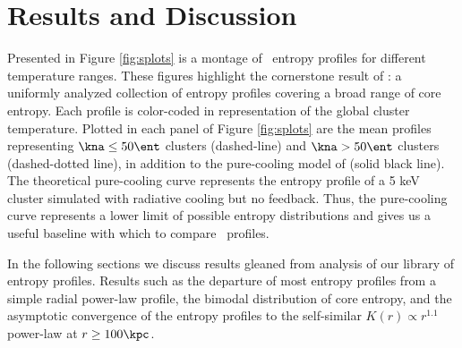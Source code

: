 \section{Results and Discussion}
\label{sec:entsuppr&d}

Presented in Figure \ref{fig:splots} is a montage of \accept\ entropy
profiles for different temperature ranges. These figures highlight the
cornerstone result of \accept: a uniformly analyzed collection of
entropy profiles covering a broad range of core entropy. Each profile
is color-coded in representation of the global cluster
temperature. Plotted in each panel of Figure \ref{fig:splots} are the
mean profiles representing $\kna \le 50 \ent$ clusters (dashed-line)
and $\kna > 50 \ent$ clusters (dashed-dotted line), in addition to the
pure-cooling model of \citet{voitbryan} (solid black line). The
theoretical pure-cooling curve represents the entropy profile of a 5
keV cluster simulated with radiative cooling but no feedback. Thus,
the pure-cooling curve represents a lower limit of possible entropy
distributions and gives us a useful baseline with which to compare
\accept\ profiles.

In the following sections we discuss results gleaned from analysis of
our library of entropy profiles. Results such as the departure of most
entropy profiles from a simple radial power-law profile, the bimodal
distribution of core entropy, and the asymptotic convergence of the
entropy profiles to the self-similar $K(r) \propto r^{1.1}$ power-law
at $r \geq 100\kpc$.

